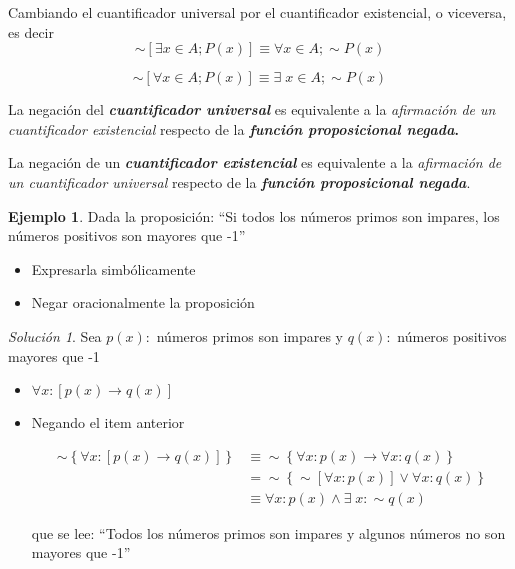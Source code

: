 \documentclass[16pt,]{krantz}
\providecommand{\tightlist}{%
  \setlength{\itemsep}{0pt}\setlength{\parskip}{0pt}}
\theoremstyle{definition}
\theoremstyle{definition}
\newtheorem{example}{Ejemplo}[chapter]
\theoremstyle{definition}
\theoremstyle{definition}
\theoremstyle{remark}
\newtheorem*{solution}{Solución}
\begin{document}
Cambiando el cuantificador universal por el cuantificador existencial, o viceversa, es decir \[\sim[\exists x\in A; P(x)]\equiv\forall x\in A;\sim P(x)\]

\[
\sim\left[\forall  x\in A; P(x)\right]\equiv\exists\; x\in A;\sim P(x)
\]

La negación del \textbf{\emph{cuantificador universal}} es equivalente a la \emph{afirmación de un cuantificador existencial} respecto de la \textbf{\emph{función proposicional negada}.}

La negación de un \textbf{\emph{cuantificador existencial}} es equivalente a la \emph{afirmación de un cuantificador universal} respecto de la \textbf{\emph{función proposicional negada}}.

\begin{example}
\protect\hypertarget{exm:wwwwwwww}{}{\label{exm:wwwwwwww} }Dada la proposición: ``Si todos los números primos son impa­res, los números positivos son mayores que -1''

\begin{itemize}
\tightlist
\item
  Expresarla simbólicamente
\item
  Negar oracionalmente la proposición
\end{itemize}
\end{example}

\begin{solution}
\iffalse{} {Solución. } \fi{}
Sea \(p(x):\) números primos son impares y \(q(x):\) números positivos mayores que -1

\begin{itemize}
\item
  \(\forall x:[p(x)\rightarrow q(x)]\)
\item
  Negando el item anterior

  \[
  \begin{aligned}
  \sim\left\{\forall x:[p(x)\rightarrow q(x)]\right\}
  &\equiv \sim\left\{\forall x:p(x)\rightarrow \forall x:q(x)\right\}\\
  &=\sim\left\{\sim[\forall x:p(x)]\vee \forall x:q(x)\right\}\\
  &\equiv\forall x:p(x)\wedge \exists\; x:\sim q(x)
  \end{aligned}
  \]

  que se lee: ``Todos los números primos son impares y algunos números no son mayores que -1''
\end{itemize}
\end{solution}
\end{document}
